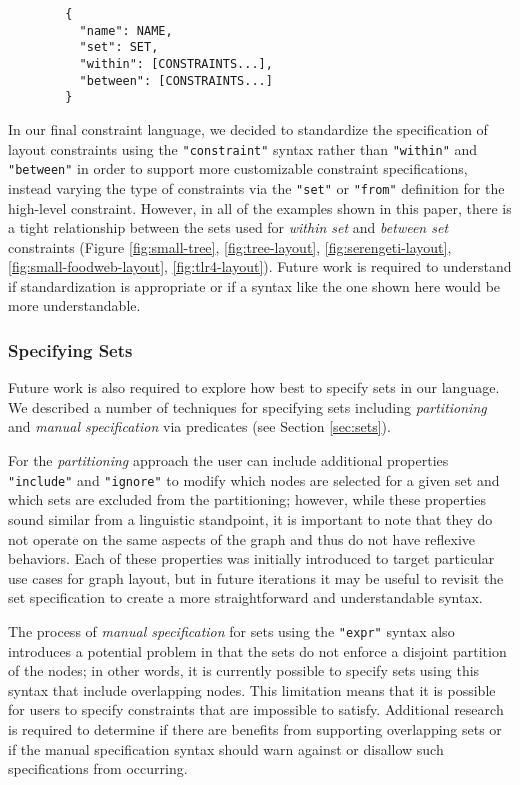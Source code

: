 \begin{verbatim}
        {
          "name": NAME,
          "set": SET,
          "within": [CONSTRAINTS...],
          "between": [CONSTRAINTS...]
        }
\end{verbatim}

In our final constraint language, we decided to standardize the specification of layout constraints using the \texttt{"constraint"} syntax rather than \texttt{"within"} and \texttt{"between"} in order to support more customizable constraint specifications, instead varying the type of constraints via the \texttt{"set"} or \texttt{"from"} definition for the high-level constraint. However, in all of the examples shown in this paper, there is a tight relationship between the sets used for \emph{within set} and \emph{between set} constraints (Figure \ref{fig:small-tree}, \ref{fig:tree-layout}, \ref{fig:serengeti-layout}, \ref{fig:small-foodweb-layout}, \ref{fig:tlr4-layout}). Future work is required to understand if standardization is appropriate or if a syntax like the one shown here would be more understandable.

\subsubsection{Specifying Sets}
Future work is also required to explore how best to specify sets in our language. We described a number of techniques for specifying sets including \emph{partitioning} and \emph{manual specification} via predicates (see Section \ref{sec:sets}).

For the \emph{partitioning} approach the user can include additional properties \texttt{"include"} and \texttt{"ignore"} to modify which nodes are selected for a given set and which sets are excluded from the partitioning; however, while these properties sound similar from a linguistic standpoint, it is important to note that they do not operate on the same aspects of the graph and thus do not have reflexive behaviors. Each of these properties was initially introduced to target particular use cases for graph layout, but in future iterations it may be useful to revisit the set specification to create a more straightforward and understandable syntax.

The process of \emph{manual specification} for sets using the \texttt{"expr"} syntax also introduces a potential problem in that the sets do not enforce a disjoint partition of the nodes; in other words, it is currently possible to specify sets using this syntax that include overlapping nodes. This limitation means that it is possible for users to specify constraints that are impossible to satisfy. Additional research is required to determine if there are benefits from supporting overlapping sets or if the manual specification syntax should warn against or disallow such specifications from occurring.

